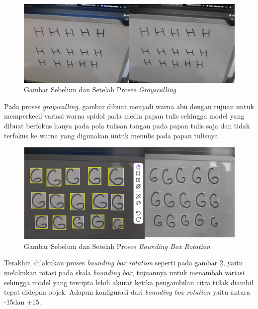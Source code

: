 \begin{figure}[H]
    \centering
    \includegraphics[scale=0.35]{gambar/grayscalling.png}
    \caption{Gambar Sebelum dan Setelah Proses \textit{Grayscalling}}
    \label{fig:grayscallingdataset}
\end{figure}

Pada proses \textit{grayscalling}, gambar dibuat menjadi warna abu dengan tujuan untuk memperkecil variasi warna spidol pada media papan tulis sehingga model yang dibuat berfokus hanya pada pola tulisan tangan pada papan tulis saja dan tidak terfokus ke warna yang digunakan untuk menulis pada papan tulisnya. \par

\begin{figure}[H]
    \centering
    \includegraphics[scale=0.32]{gambar/bbrotation.png}
    \caption{Gambar Sebelum dan Setelah Proses \textit{Bounding Box Rotation}}
    \label{fig:bbrotation}
\end{figure}

Terakhir, dilakukan proses \textit{bounding box rotation} seperti pada gambar \ref*{fig:bbrotation}, yaitu melakukan rotasi pada skala \textit{bounding box}, tujuannya untuk menambah variasi sehingga model yang tercipta lebih akurat ketika pengambilan citra tidak diambil tepat didepan objek. Adapun konfigurasi dari \textit{bounding box rotation} yaitu antara -15\textdegree\space dan +15\textdegree. \par

